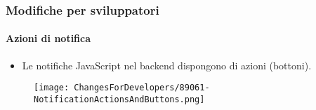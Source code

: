 %
%
%
%
%
%
%


\begin{frame}[fragile]
	\frametitle{Modifiche per sviluppatori}
	\framesubtitle{Azioni di notifica}

	\begin{itemize}
		\item Le notifiche JavaScript nel backend dispongono di azioni (bottoni).
	\end{itemize}

	\begin{figure}
		\texttt{[image: ChangesForDevelopers/89061-NotificationActionsAndButtons.png]}
	\end{figure}

\end{frame}


